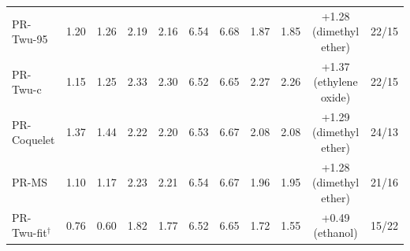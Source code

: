 \begin{table}[H]
\begin{tabular}{lcccccccccc}
PR-Twu-95 & 1.20 & 1.26 & 2.19 & 2.16 & 6.54 & 6.68 & 1.87 & 1.85 & +1.28 (dimethyl ether) & 22/15 \\
PR-Twu-c & 1.15 & 1.25 & 2.33 & 2.30 & 6.52 & 6.65 & 2.27 & 2.26 & +1.37 (ethylene oxide) & 22/15 \\
PR-Coquelet & 1.37 & 1.44 & 2.22 & 2.20 & 6.53 & 6.67 & 2.08 & 2.08 & +1.29 (dimethyl ether) & 24/13 \\
PR-MS & 1.10 & 1.17 & 2.23 & 2.21 & 6.54 & 6.67 & 1.96 & 1.95 & +1.28 (dimethyl ether) & 21/16 \\
PR-Twu-fit$^{\dagger}$ & 0.76 & 0.60 & 1.82 & 1.77 & 6.52 & 6.65 & 1.72 & 1.55 & +0.49 (ethanol) & 15/22 \\
\bottomrule
\end{tabular}
\end{table}
